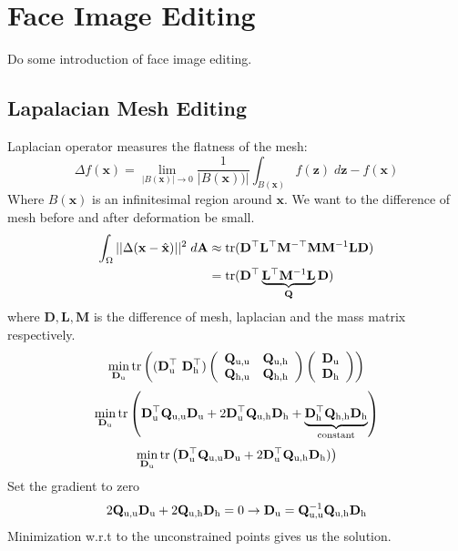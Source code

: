 \section{Face Image Editing}
Do some introduction of face image editing.

\subsection{Lapalacian Mesh Editing}
Laplacian operator measures the flatness of the mesh:
$$\Delta f(\mathbf{x}) = \lim_{|B(\mathbf{x})| \rightarrow 0} \frac{1}{|B(\mathbf{x}))|} \int_{B(\mathbf{x})} f(\mathbf{z}) \;d\mathbf{z} - f(\mathbf{x})$$
Where $B(\mathbf{x})$ is an infinitesimal region around $\mathbf{x}$.
We want to the difference of mesh before and after deformation be small.  
\begin{align*}
\int_\Omega ||\Delta(\mathbf{x} - \hat{\mathbf{x}})||^2 \; d\mathbf{A} & \approx \text{tr}( \mathbf{D}^\top \mathbf{L}^\top \mathbf{M}^{-\top} \mathbf{M} \mathbf{M}^{-1} \mathbf{L}\mathbf{D})\\
&= \text{tr}(  \mathbf{D}^\top \underbrace{\mathbf{L}^\top \mathbf{M}^{-1} \mathbf{L}}_{\mathbf{Q}} \mathbf{D})
\end{align*}
where $\mathbf{D}, \mathbf{L}, \mathbf{M}$ is the difference of mesh, laplacian and the mass matrix respectively. 
$$
\min_{\mathbf{D}_\text{u}}
\operatorname{tr} \left((\mathbf{D}_\text{u}^\top \ \mathbf{D}_\text{h}^\top)
\left(\begin{array}{cc}
\mathbf{Q}_\text{u,u} & \mathbf{Q}_\text{u,h} \\
\mathbf{Q}_\text{h,u} & \mathbf{Q}_\text{h,h} 
\end{array}\right)
\left(\begin{array}{c}
  \mathbf{D}_\text{u} \\
  \mathbf{D}_\text{h}
\end{array}
\right)\right)
$$
$$
\min_{\mathbf{D}_\text{u}}
\operatorname{tr}\left(\mathbf{D}_\text{u}^\top \mathbf{Q}_\text{u,u} \mathbf{D}_\text{u} +
2 \mathbf{D}_\text{u}^\top \mathbf{Q}_\text{u,h} \mathbf{D}_\text{h} + 
\underbrace{\mathbf{D}_\text{h}^\top \mathbf{Q}_\text{h,h}
\mathbf{D}_\text{h}}_\text{constant}\right)
$$
$$
\min_{\mathbf{D}_\text{u}} 
\operatorname{tr}\left(
\mathbf{D}_\text{u}^\top \mathbf{Q}_\text{u,u} \mathbf{D}_\text{u} +
2 \mathbf{D}_\text{u}^\top \mathbf{Q}_\text{u,h} \mathbf{D}_\text{h})
\right)
$$
Set the gradient to zero
$$2 \mathbf{Q}_\text{u,u} \mathbf{D}_\text{u} + 2 \mathbf{Q}_\text{u,h} \mathbf{D}_\text{h} = 0 \rightarrow \mathbf{D}_\text{u} = \mathbf{Q}_\text{u,u}^{-1} \mathbf{Q}_\text{u,h} \mathbf{D}_\text{h}$$
Minimization w.r.t to the unconstrained points gives us the solution.
